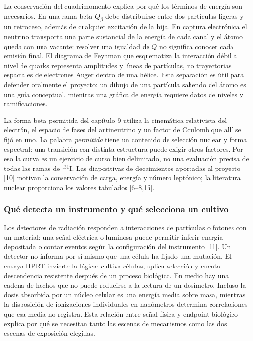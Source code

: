 La conservación del cuadrimomento explica por qué los términos de
energía son necesarios. En una rama beta $Q_\beta$ debe distribuirse
entre dos partículas ligeras y un retroceso, además de cualquier
excitación de la hija. En captura electrónica el neutrino transporta
una parte sustancial de la energía de cada canal y el átomo queda con
una vacante; resolver una igualdad de $Q$ no significa conocer cada
emisión final. El diagrama de Feynman que esquematiza la interacción
débil a nivel de quarks representa amplitudes y líneas de partículas,
no trayectorias espaciales de electrones Auger dentro de una hélice.
Esta separación es útil para defender oralmente el proyecto: un dibujo
de una partícula saliendo del átomo es una guía conceptual, mientras
una gráfica de energía requiere datos de niveles y ramificaciones.

La forma beta permitida del capítulo 9 utiliza la cinemática relativista
del electrón, el espacio de fases del antineutrino y un factor de Coulomb
que allí se fijó en uno. La palabra \emph{permitida} tiene un contenido
de selección nuclear y forma espectral: una transición con distinta
estructura puede exigir otros factores. Por eso la curva es un ejercicio
de curso bien delimitado, no una evaluación precisa de todas las ramas
de $^{131}$I. Las diapositivas de decaimientos aportadas al proyecto
[10] motivan la conservación de carga, energía y número leptónico; la
literatura nuclear proporciona los valores tabulados [6--8,15].

\subsubsection{Qué detecta un instrumento y qué selecciona un cultivo}
Los detectores de radiación responden a interacciones de partículas o
fotones con un material: una señal eléctrica o luminosa puede permitir
inferir energía depositada o contar eventos según la configuración del
instrumento [11]. Un detector no informa por sí mismo que una célula
ha fijado una mutación. El ensayo HPRT invierte la lógica: cultiva
células, aplica selección y cuenta descendencia resistente después
de un proceso biológico. En medio hay una cadena de hechos que no
puede reducirse a la lectura de un dosímetro. Incluso la dosis absorbida
por un núcleo celular es una energía media sobre masa, mientras la
disposición de ionizaciones individuales en nanómetros determina
correlaciones que esa media no registra. Esta relación entre señal
física y endpoint biológico explica por qué se necesitan tanto las
escenas de mecanismos como las dos escenas de exposición elegidas.

